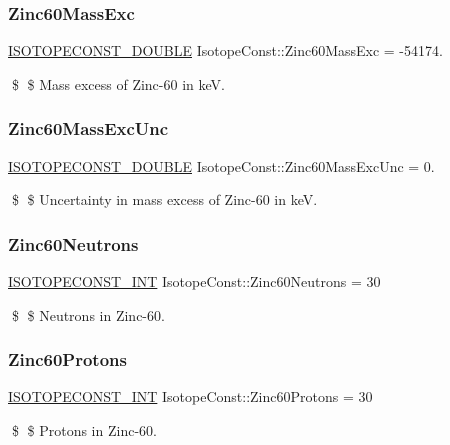 \subsubsection{\texorpdfstring{Zinc60\+Mass\+Exc}{Zinc60MassExc}}
{\footnotesize\ttfamily \mbox{\hyperlink{group___isotope_const-_macros_ga8f45a7272ce02c0b4c65c44636ed719a}{I\+S\+O\+T\+O\+P\+E\+C\+O\+N\+S\+T\+\_\+\+D\+O\+U\+B\+LE}} Isotope\+Const\+::\+Zinc60\+Mass\+Exc = -\/54174.}

\$ \$ Mass excess of Zinc-\/60 in keV. \mbox{\label{group___isotope_const-_zinc-_zn60_ga8adaed9d158ed83dc3dac45d46953c1b}} 
\subsubsection{\texorpdfstring{Zinc60\+Mass\+Exc\+Unc}{Zinc60MassExcUnc}}
{\footnotesize\ttfamily \mbox{\hyperlink{group___isotope_const-_macros_ga8f45a7272ce02c0b4c65c44636ed719a}{I\+S\+O\+T\+O\+P\+E\+C\+O\+N\+S\+T\+\_\+\+D\+O\+U\+B\+LE}} Isotope\+Const\+::\+Zinc60\+Mass\+Exc\+Unc = 0.}

\$ \$ Uncertainty in mass excess of Zinc-\/60 in keV. \mbox{\label{group___isotope_const-_zinc-_zn60_gaeafdc0fb5dc558d1b69402fc6eb36dd5}} 
\subsubsection{\texorpdfstring{Zinc60\+Neutrons}{Zinc60Neutrons}}
{\footnotesize\ttfamily \mbox{\hyperlink{group___isotope_const-_macros_ga5f18360b3e99483a35c32d789e62621c}{I\+S\+O\+T\+O\+P\+E\+C\+O\+N\+S\+T\+\_\+\+I\+NT}} Isotope\+Const\+::\+Zinc60\+Neutrons = 30}

\$ \$ Neutrons in Zinc-\/60. \mbox{\label{group___isotope_const-_zinc-_zn60_ga4f4ca29f5e326db2b3709965410df7ef}} 
\subsubsection{\texorpdfstring{Zinc60\+Protons}{Zinc60Protons}}
{\footnotesize\ttfamily \mbox{\hyperlink{group___isotope_const-_macros_ga5f18360b3e99483a35c32d789e62621c}{I\+S\+O\+T\+O\+P\+E\+C\+O\+N\+S\+T\+\_\+\+I\+NT}} Isotope\+Const\+::\+Zinc60\+Protons = 30}

\$ \$ Protons in Zinc-\/60. 